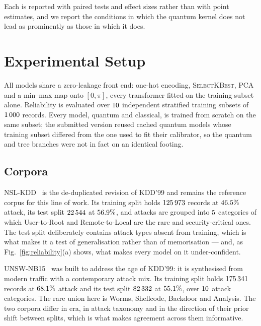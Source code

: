 \documentclass[journal]{IEEEtran}
\begin{document}
Each is reported with paired tests and effect sizes rather than with point
estimates, and we report the conditions in which the quantum kernel does not
lead as prominently as those in which it does.

\section{Experimental Setup}\label{sec:setup}

All models share a zero-leakage front end: one-hot encoding,
\textsc{SelectKBest}, PCA and a min--max map onto $[0,\pi]$, every
transformer fitted on the training subset alone. Reliability is evaluated
over $10$ independent stratified training subsets of $1\,000$
records. Every model, quantum and classical, is trained from scratch on the
same subset; the submitted version reused cached quantum models whose
training subset differed from the one used to fit their calibrator, so the
quantum and tree branches were not in fact on an identical footing.

\subsection{Corpora}
NSL-KDD~\cite{tavallaee2009nslkdd} is the de-duplicated revision of KDD'99
and remains the reference corpus for this line of work. Its training split
holds $125\,973$ records at $46.5\%$ attack, its test
split $22\,544$ at $56.9\%$, and attacks are grouped
into $5$ categories of which User-to-Root and Remote-to-Local
are the rare and security-critical ones. The test split deliberately
contains attack types absent from training, which is what makes it a test of
generalisation rather than of memorisation --- and, as
Fig.~\ref{fig:reliability}(a) shows, what makes every model on it
under-confident.

UNSW-NB15~\cite{moustafa2015unsw} was built to address the age of KDD'99: it
is synthesised from modern traffic with a contemporary attack mix. Its
training split holds $175\,341$ records at
$68.1\%$ attack and its test split $82\,332$ at
$55.1\%$, over $10$ attack categories. The rare
union here is Worms, Shellcode, Backdoor and Analysis. The two corpora
differ in era, in attack taxonomy and in the direction of their prior shift
between splits, which is what makes agreement across them informative.
\end{document}
